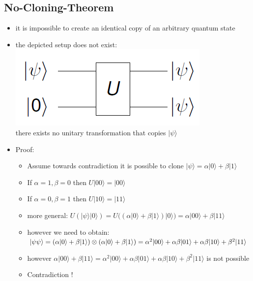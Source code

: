 \documentclass[12pt,a4paper]{article}
\newcommand{\ket}[1]{\vert #1 \rangle}
\begin{document}
\subsection{No-Cloning-Theorem}
\begin{itemize}
\item it is impossible to create an identical copy of an arbitrary quantum state
\item the depicted setup does not exist:\\\includegraphics[scale=0.5]{./resources/noclone.png}\\
there exists no unitary transformation that copies $\ket{\psi}$
\item Proof:
\begin{itemize}
\item Assume towards contradiction it is possible to clone $\ket{\psi} = \alpha \ket{0} + \beta \ket{1}$
\item If $\alpha = 1, \beta = 0$ then $U\ket{00}=\ket{00}$
\item If $\alpha = 0, \beta = 1$ then $U\ket{10}=\ket{11}$
\item more general: $U(\ket{\psi}\ket{0}) = U\big( (\alpha \ket{0} + \beta \ket{1})\ket{0}\big) = \alpha\ket{00}+\beta\ket{11}$
\item however we need to obtain: $\ket{\psi\psi} = (\alpha\ket{0}+\beta\ket{1})\otimes(\alpha\ket{0}+\beta\ket{1})=\\\alpha^2\ket{00}+\alpha\beta\ket{01}+\alpha\beta\ket{10}+\beta^2\ket{11}$
\item however $\alpha\ket{00}+\beta\ket{11} = \alpha^2\ket{00}+\alpha\beta\ket{01}+\alpha\beta\ket{10}+\beta^2\ket{11}$ is not possible 
\item Contradiction !
\end{itemize}
\end{itemize}
\end{document}
